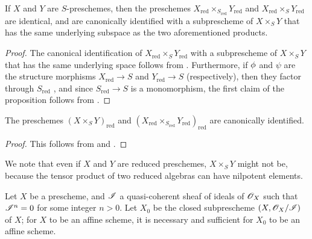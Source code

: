 \begin{prop}[5.1.7]
\label{1.5.1.7}
If $X$ and $Y$ are $S$-preschemes, then the preschemes $X_\mathrm{red}\times_{S_\mathrm{red}}Y_\mathrm{red}$ and $X_\mathrm{red}\times_S Y_\mathrm{red}$ are identical, and are canonically identified with a subprescheme of $X\times_S Y$ that has the same underlying subspace as the two aforementioned products.
\end{prop}

\begin{proof}
\label{proof-1.5.1.7}
The canonical identification of $X_\mathrm{red}\times_S Y_\mathrm{red}$ with a subprescheme of $X\times_S Y$ that has the same underlying space follows from .
Furthermore, if $\phi$ and $\psi$ are the structure morphisms $X_\mathrm{red}\to S$ and $Y_\mathrm{red}\to S$ (respectively), then they factor through $S_\mathrm{red}$ , and since $S_\mathrm{red}\to S$ is a monomorphism, the first claim of the proposition follows from .
\end{proof}

\begin{cor}[5.1.8]
\label{1.5.1.8}
The preschemes $(X\times_S Y)_\mathrm{red}$ and $(X_\mathrm{red}\times_{S_\mathrm{red}}Y_\mathrm{red})_\mathrm{red}$ are canonically identified.
\end{cor}

\begin{proof}
\label{proof-1.5.1.8}
This follows from  and .
\end{proof}

We note that even if $X$ and $Y$ are reduced preschemes, $X\times_S Y$ might not be, because the tensor product of two reduced algebras can have nilpotent elements.

\begin{prop}[5.1.9]
\label{1.5.1.9}
Let $X$ be a prescheme, and $\mathscr{I}$ a quasi-coherent sheaf of ideals of $\mathscr{O}_X$ such that $\mathscr{I}^n=0$ for some integer $n>0$.
Let $X_0$ be the closed subprescheme $(X,\mathscr{O}_X/\mathscr{I})$ of $X$;
for $X$ to be an affine scheme, it is necessary and sufficient for $X_0$ to be an affine scheme.
\end{prop}

